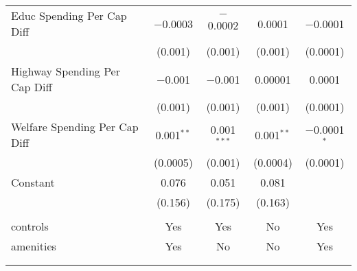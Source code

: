 \begin{table}[!htbp]
\begin{tabular}{@{\extracolsep{5pt}}lcccc}
  Educ Spending Per Cap Diff & $-$0.0003 & $-$0.0002 & 0.0001 & $-$0.0001 \\ 
  & (0.001) & (0.001) & (0.001) & (0.0001) \\ 
  Highway Spending Per Cap Diff & $-$0.001 & $-$0.001 & 0.00001 & 0.0001 \\ 
  & (0.001) & (0.001) & (0.001) & (0.0001) \\ 
  Welfare Spending Per Cap Diff & 0.001$^{**}$ & 0.001$^{***}$ & 0.001$^{**}$ & $-$0.0001$^{*}$ \\ 
  & (0.0005) & (0.001) & (0.0004) & (0.0001) \\ 
  Constant & 0.076 & 0.051 & 0.081 &  \\ 
  & (0.156) & (0.175) & (0.163) &  \\ 
 \hline \\[-1.8ex] 
controls & Yes & Yes & No & Yes \\ 
amenities & Yes & No & No & Yes \\ 
\hline \\[-1.8ex] 
\hline 
\hline \\[-1.8ex] 
\end{tabular} 
\end{table} 
